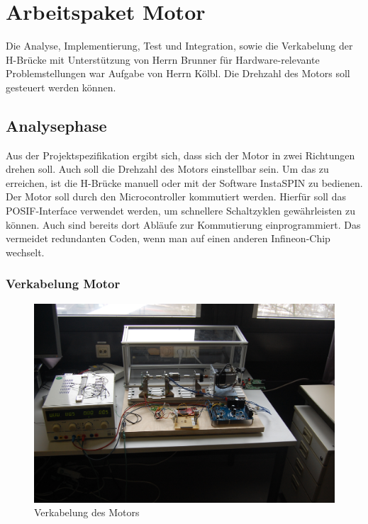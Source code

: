 

\chapter{Arbeitspaket Motor}
Die Analyse, Implementierung, Test und Integration, sowie die Verkabelung der H-Brücke mit Unterst\"utzung von Herrn Brunner f\"ur Hardware-relevante Problemstellungen war Aufgabe von Herrn Kölbl. Die Drehzahl des Motors soll gesteuert werden können.

\section{Analysephase}
Aus der Projektspezifikation ergibt sich, dass sich der Motor in zwei Richtungen drehen soll. Auch soll die Drehzahl des Motors einstellbar sein. Um das zu erreichen, ist die H-Brücke manuell oder mit der Software InstaSPIN zu bedienen. Der Motor soll durch den Microcontroller kommutiert werden. Hierfür soll das POSIF-Interface verwendet werden, um schnellere Schaltzyklen gewährleisten zu können. Auch sind bereits dort Abläufe zur Kommutierung einprogrammiert. Das vermeidet redundanten Coden, wenn man auf einen anderen Infineon-Chip wechselt.

\subsection{Verkabelung Motor}
\begin{figure}
    \includegraphics[width=\textwidth]{motor/MotorWiring.JPG}
    \caption{Verkabelung des Motors}
    \label{fig:MotorWiring}
\end{figure}

